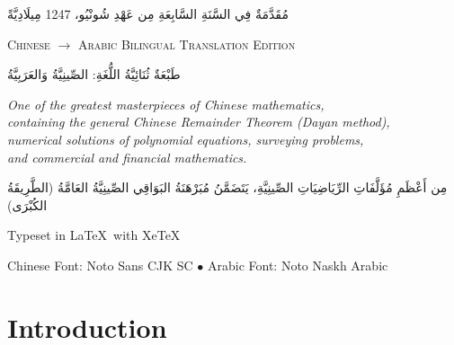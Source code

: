\documentclass[11pt,a4paper]{article}
\newcommand{\ar}[1]{\arabicfont\beginR #1\endR}
\begin{document}
\begin{titlepage}
\begin{center}
\vspace{0.2cm}

{\footnotesize\ar{مُقَدَّمَةٌ فِي السَّنَةِ السَّابِعَةِ مِن عَهْدِ شُونْيُو، 1247 مِيلَادِيَّةً}}

\vspace{1.5cm}

{\small\textsc{Chinese $\rightarrow$ Arabic Bilingual Translation Edition}}

\vspace{0.3cm}

{\footnotesize\ar{طَبْعَةٌ ثُنَائِيَّةُ اللُّغَةِ: الصِّينِيَّةُ وَالعَرَبِيَّةُ}}

\vfill

{\footnotesize
\textit{One of the greatest masterpieces of Chinese mathematics,}\\
\textit{containing the general Chinese Remainder Theorem (Dayan method),}\\
\textit{numerical solutions of polynomial equations, surveying problems,}\\
\textit{and commercial and financial mathematics.}}

\vspace{0.3cm}

{\footnotesize\ar{مِن أَعْظَمِ مُؤَلَّفَاتِ الرِّيَاضِيَاتِ الصِّينِيَّةِ، يَتَضَمَّنُ مُبَرْهَنَةُ البَوَاقِي الصِّينِيَّةُ العَامَّةُ (الطَّرِيقَةُ الكُبْرَى)}}

\vspace{0.5cm}

{\small Typeset in \LaTeX\ with XeTeX}

\vspace{0.2cm}

{\footnotesize Chinese Font: Noto Sans CJK SC $\bullet$ Arabic Font: Noto Naskh Arabic}

\end{center}
\end{titlepage}

\tableofcontents
\newpage

\section{Introduction}
\end{document}
